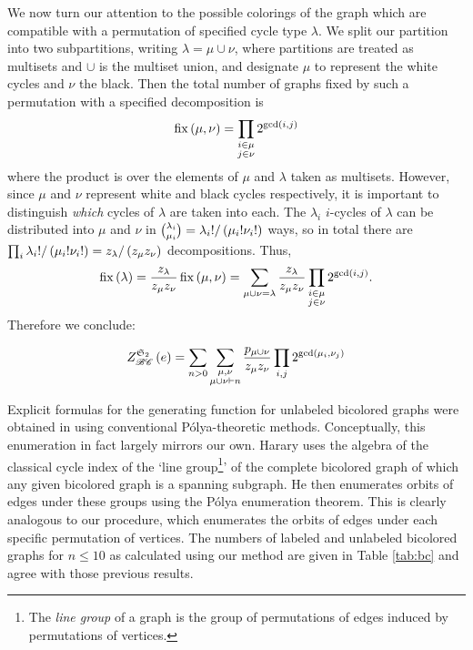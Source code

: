 \documentclass[distribution,draft]{brandiss} %
\numberwithin{section}{chapter}
\numberwithin{figure}{chapter}
\begin{document}
We now turn our attention to the possible colorings of the graph which are compatible with a permutation of specified cycle type $\lambda$.
We split our partition into two subpartitions, writing $\lambda = \mu \cup \nu$, where partitions are treated as multisets and $\cup$ is the multiset union, and designate $\mu$ to represent the white cycles and $\nu$ the black.
Then the total number of graphs fixed by such a permutation with a specified decomposition is
\begin{equation*}
  \operatorname{fix} \left( {\mu, \nu} \right) = \prod_{\substack{i \in \mu \\ j \in \nu}} 2^{\gcd \left( {i, j} \right)}
\end{equation*}
where the product is over the elements of $\mu$ and $\lambda$ taken as multisets.
However, since $\mu$ and $\nu$ represent white and black cycles respectively, it is important to distinguish \emph{which} cycles of $\lambda$ are taken into each.
The $\lambda_{i}$ $i$-cycles of $\lambda$ can be distributed into $\mu$ and $\nu$ in $\binom{\lambda_{i}}{\mu_{i}} = \lambda_{i}! / \left( {\mu_{i}! \nu_{i}!} \right)$ ways, so in total there are $\prod_{i} \lambda_{i}! / \left( {\mu_{i}! \nu_{i}!} \right) = z_{\lambda} / \left( {z_{\mu} z_{\nu}} \right)$ decompositions.
Thus,
\begin{equation*}
  \operatorname{fix} \left( {\lambda} \right) = \frac{z_{\lambda}}{z_{\mu} z_{\nu}} \operatorname{fix} \left( {\mu, \nu} \right) = \sum_{\mu \cup \nu = \lambda} \frac{z_{\lambda}}{z_{\mu} z_{\nu}} \prod_{\substack{i \in \mu \\ j \in \nu}} 2^{\gcd \left( {i, j} \right)}.
\end{equation*}
Therefore we conclude:
\begin{theorem}
  \begin{equation}
    \label{eq:ecibc}
    \gcielt{\symgp{2}}{\specname{BC}}{e} = \sum_{n > 0} \sum_{\substack{\mu, \nu \\ \mu \cup \nu \vdash n}} \frac{p_{\mu \cup \nu}}{z_{\mu} z_{\nu}} \prod_{i, j} 2^{\gcd \pbrac{\mu_{i}, \nu_{j}}}
  \end{equation}
\end{theorem}

Explicit formulas for the generating function for unlabeled bicolored graphs were obtained in \cite{har:bicolored} using conventional P\'{o}lya-theoretic methods.
Conceptually, this enumeration in fact largely mirrors our own.
Harary uses the algebra of the classical cycle index of the `line group\footnote{The \emph{line group} of a graph is the group of permutations of edges induced by permutations of vertices.}' of the complete bicolored graph of which any given bicolored graph is a spanning subgraph.
He then enumerates orbits of edges under these groups using the P\'{o}lya enumeration theorem.
This is clearly analogous to our procedure, which enumerates the orbits of edges under each specific permutation of vertices.
The numbers of labeled and unlabeled bicolored graphs for $n \leq 10$ as calculated using our method are given in Table \ref{tab:bc} and agree with those previous results.
\end{document}
